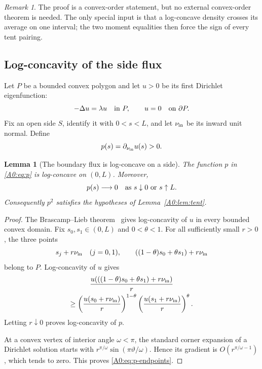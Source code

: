 \documentclass[11pt]{amsart}
\numberwithin{equation}{section}
\newtheorem{lemma}[theorem]{Lemma}
\theoremstyle{definition}
\theoremstyle{remark}
\newtheorem{remark}[theorem]{Remark}
\begin{document}
\begin{remark}
The proof is a convex-order statement, but no external convex-order
theorem is needed.  The only special input is that a log-concave density
crosses its average on one interval; the two moment equalities then force
the sign of every tent pairing.
\end{remark}

\subsection{Log-concavity of the side flux}

Let \(P\) be a bounded convex polygon and let \(u>0\) be its first
Dirichlet eigenfunction:
\begin{equation}
 -\Delta u=\lambda u\quad\hbox{in }P,\qquad
 u=0\quad\hbox{on }\partial P.
\end{equation}
Fix an open side \(S\), identify it with \(0<s<L\), and let
\(\nu_{\rm in}\) be its inward unit normal.  Define
\begin{equation}\label{A0:eq:p}
 p(s)=\partial_{\nu_{\rm in}}u(s)>0.
\end{equation}

\begin{lemma}[The boundary flux is log-concave on a side]
\label{A0:lem:flux-logconcave}
The function \(p\) in \eqref{A0:eq:p} is log-concave on \((0,L)\).
Moreover,
\begin{equation}\label{A0:eq:p-endpoints}
 p(s)\longrightarrow0
 \quad\hbox{as }s\downarrow0\hbox{ or }s\uparrow L.
\end{equation}
Consequently \(p^2\) satisfies the hypotheses of
Lemma~\ref{A0:lem:tent}.
\end{lemma}

\begin{proof}
The Brascamp--Lieb theorem~\cite{BL76} gives log-concavity of \(u\) in every bounded
convex domain.  Fix \(s_0,s_1\in(0,L)\) and \(0<\theta<1\).  For all
sufficiently small \(r>0\), the three points
\[
 s_j+r\nu_{\rm in}\quad(j=0,1),\qquad
 ((1-\theta)s_0+\theta s_1)+r\nu_{\rm in}
\]
belong to \(P\).  Log-concavity of \(u\) gives
\begin{multline}
 \frac{u(((1-\theta)s_0+\theta s_1)+r\nu_{\rm in})}{r}\\
 \ge
 \left(\frac{u(s_0+r\nu_{\rm in})}{r}\right)^{1-\theta}
 \left(\frac{u(s_1+r\nu_{\rm in})}{r}\right)^\theta.
\end{multline}
Letting \(r\downarrow0\) proves log-concavity of \(p\).

At a convex vertex of interior angle \(\omega<\pi\), the standard corner
expansion of a Dirichlet solution starts with
\(r^{\pi/\omega}\sin(\pi\vartheta/\omega)\).  Hence its gradient is
\(O(r^{\pi/\omega-1})\), which tends to zero.  This proves
\eqref{A0:eq:p-endpoints}.
\end{proof}
\end{document}
